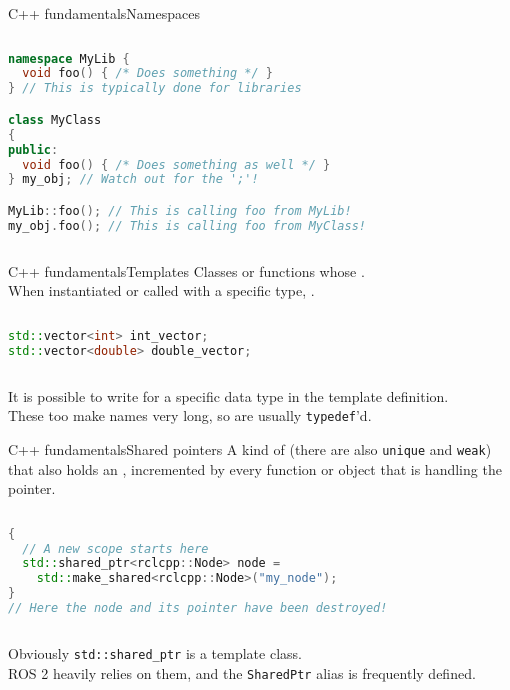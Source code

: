 \begin{frame}[fragile]{C++ fundamentals}{Namespaces}
	\begin{columns}
		\begin{lstlisting}[language=C++, caption=Example of namespaces usage.]
namespace MyLib {
  void foo() { /* Does something */ }
} // This is typically done for libraries

class MyClass
{
public:
  void foo() { /* Does something as well */ }
} my_obj; // Watch out for the ';'!

MyLib::foo(); // This is calling foo from MyLib!
my_obj.foo(); // This is calling foo from MyClass!\end{lstlisting}
	\end{columns}
\end{frame}
\begin{frame}[fragile]{C++ fundamentals}{Templates}
	Classes or functions whose .\\
  When instantiated or called with a specific type, .
  \vspace{.5cm}
	\begin{columns}
		\column{.9\textwidth}
		\begin{lstlisting}[language=C++, caption=Example of objects of the template class \texttt{std::vector}.]
std::vector<int> int_vector;
std::vector<double> double_vector;\end{lstlisting}
	\end{columns}
  \vspace{.5cm}
  It is possible to write  for a specific data type in the template definition.\\
	These too make names very long, so are usually \texttt{typedef}'d.
\end{frame}
\begin{frame}[fragile]{C++ fundamentals}{Shared pointers}
	A kind of  (there are also \texttt{unique} and \texttt{weak}) that also holds an , incremented by every function or object that is handling the pointer.\\
  \vspace{.1cm}
	\begin{columns}
		\begin{lstlisting}[language=C++, caption=Example of shared pointer creation.]
{
  // A new scope starts here
  std::shared_ptr<rclcpp::Node> node =
    std::make_shared<rclcpp::Node>("my_node");
}
// Here the node and its pointer have been destroyed!\end{lstlisting}
	\end{columns}
  \vspace{.1cm}
	Obviously \texttt{std::shared\_ptr} is a template class.\\
  ROS 2 heavily relies on them, and the \texttt{SharedPtr} alias is frequently defined.
\end{frame}
